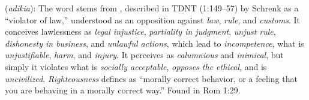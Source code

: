 \item[Unrighteousness,]

(\textit{adikia}):
The word stems from , described in TDNT (1:149--57) by Schrenk as a ``violator of law,'' understood as an opposition against \emph{law}, \emph{rule}, and \emph{customs}. It conceives lawlessness as \emph{legal injustice}, \emph{partiality in judgment}, \emph{unjust rule}, \emph{dishonesty in business}, and \emph{unlawful actions}, which lead to \emph{incompetence}, what is \emph{unjustifiable}, \emph{harm}, and \emph{injury}. It perceives as \emph{calumnious} and \emph{inimical}, but simply it violates what is \emph{socially acceptable}, \emph{opposes the ethical}, and is \emph{uncivilized}. \emph{Righteousness} defines as ``morally correct behavior, or a feeling that you are behaving in a morally correct way.''
Found in Rom 1:29.
